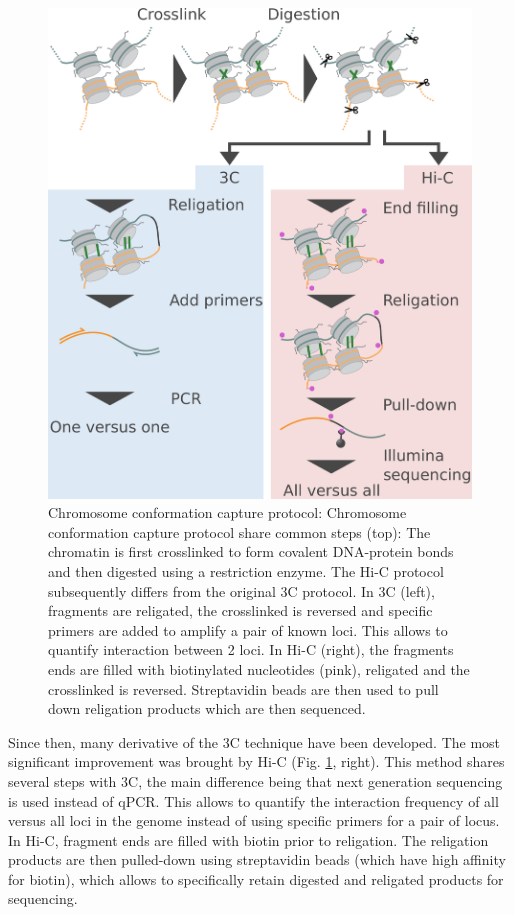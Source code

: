 \begin{figure}[b]
    \includegraphics[width=\textwidth]{Parts/Part01/gfx/3c_protocol.pdf}
    \caption{Chromosome conformation capture protocol: Chromosome conformation capture protocol share common steps (top): The chromatin is first crosslinked to form covalent DNA-protein bonds and then digested using a restriction enzyme. The Hi-C protocol subsequently differs from the original 3C protocol. In 3C (left), fragments are religated, the crosslinked is reversed and specific primers are added to amplify a pair of known loci. This allows to quantify interaction between 2 loci. In Hi-C (right), the fragments ends are filled with biotinylated nucleotides (pink), religated and the crosslinked is reversed. Streptavidin beads are then used to pull down religation products which are then sequenced.}
	\label{fig:01-02:3c}
\end{figure}

Since then, many derivative of the \acrshort{3C} technique have been developed. The most significant improvement was brought by Hi-C (Fig. \ref{fig:01-02:3c}, right). This method shares several steps with 3C, the main difference being that next generation sequencing is used instead of qPCR. This allows to quantify the interaction frequency of all versus all loci in the genome instead of using specific primers for a pair of locus. In Hi-C, fragment ends are filled with biotin prior to religation. The religation products are then pulled-down using streptavidin beads (which have high affinity for biotin), which allows to specifically retain digested  and religated products for sequencing.

